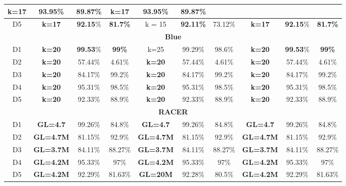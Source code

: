 \begin{table}
{\begin{tabular}{ |c|c|c|c|c|c|c|c|c|c| }
                         \textbf{k=17} & \textbf{93.95}\% & \textbf{89.87\%} &
                         \textbf{k=17} & \textbf{93.95}\% & \textbf{89.87}\%
\\ \hline                           
                         D5 & \textbf{k=17} & \textbf{92.15}\% & \textbf{81.7\%} & k = 15 & \textbf{92.11\%} & 73.12\% &
                         \textbf{k=17} & \textbf{92.15}\% & \textbf{81.7\%} \\
  \hline
  \multicolumn{10}{|c|}{\textbf{Blue}}\\
  \hline
 					 D1 & \textbf{k=20} & \textbf{99.53}\% & \textbf{99\%} & k=25 & 99.29\% & 98.6\% & \textbf{k=20} & \textbf{99.53}\% & \textbf{99\%}
\\ \hline
     					  D2 & \textbf{k=20} & 57.44\% & 4.61\% & \textbf{k=20} & 57.44\% & 4.61\% & \textbf{k=20} & 57.44\% & 4.61\% 
\\ \hline
     				 D3  & \textbf{ k=20} & 84.17\% & 99.2\% & \textbf{k=20} & 84.17\% & 99.2\% & \textbf{k=20} & 84.17\% & 99.2\% 
\\ \hline                        
                         D4 & \textbf{ k=20} & 95.31\% & 98.5\% & \textbf{ k=20} & 95.31\% & 98.5\% & \textbf{ k=20} & 95.31\% & 98.5\%
\\ \hline                           
                         D5 & \textbf{ k=20} & 92.33\% & 88.9\% & \textbf{ k=20} & 92.33\% & 88.9\% & \textbf{ k=20} & 92.33\% & 88.9\%\\
  \hline
  \multicolumn{10}{|c|}{\textbf{RACER}}\\
  \hline
                         D1 & \textbf{GL=4.7} & 99.26\% & 84.8\% & \textbf{GL=4.7} & 99.26\% & 84.8\% & \textbf{GL=4.7} & 99.26\% & 84.8\%\\ 
 \hline
     					  D2 & \textbf{GL=4.7M} & 81.15\% & 92.9\% & \textbf{GL=4.7M} & 81.15\% & 92.9\% & \textbf{GL=4.7M} & 81.15\% & 92.9\%
\\ \hline
     				 D3  & \textbf{GL=3.7M} & 84.11\% & 88.27\%  & \textbf{GL=3.7M} & 84.11\% & 88.27\% & \textbf{GL=3.7M} & 84.11\% & 88.27\%
\\ \hline                        
                         D4 & \textbf{GL=4.2M} & 95.33\% & 97\% & \textbf{GL=4.2M} & 95.33\% & 97\% & \textbf{GL=4.2M} & 95.33\% & 97\%
\\ \hline                           
                         D5 & \textbf{GL=4.2M} & 92.29\% & 81.63\% & \textbf{GL=20M} & 92.28\% &  80.5\% & \textbf{GL=4.2M} & 92.29\% & 81.63\%
  \\ \hline 
  \end{tabular}}
\label{tb1:Lighter-Blue-Racer-Perplexity-vs-Alignment}
\end{table}
